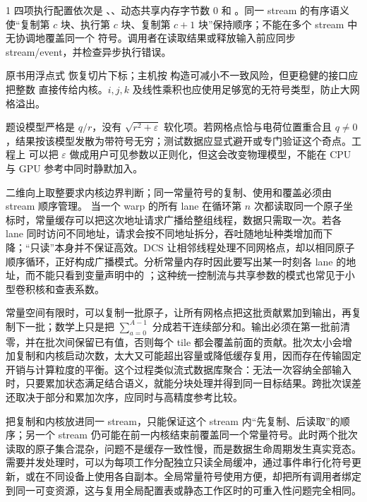 \begin{solutionexercise}{1}
四项执行配置依次是 、、动态共享内存字节数 0 和
。同一 stream 的有序语义使“复制第 $c$ 块、执行第 $c$ 块、复制第
$c+1$ 块”保持顺序；不能在多个 stream 中无协调地覆盖同一个 
符号。调用者在读取结果或释放输入前应同步 stream/event，并检查异步执行错误。

原书用浮点式  恢复切片下标；主机按
 构造可减小不一致风险，但更稳健的接口应把整数 
直接传给内核。$i,j,k$ 及线性乘积也应使用足够宽的无符号类型，防止大网格溢出。

题设模型严格是 $q/r$，没有 $\sqrt{r^2+\varepsilon}$ 软化项。若网格点恰与电荷位置重合且
$q\ne0$，结果按该模型发散为带符号无穷；测试数据应显式避开或专门验证这个奇点。工程上
可以把 $\varepsilon$ 做成用户可见参数以正则化，但这会改变物理模型，不能在 CPU 与 GPU
参考中同时静默加入。

\conclusionheading 二维向上取整要求内核边界判断；同一常量符号的复制、使用和覆盖必须由
stream 顺序管理。
\discussionheading
{}
当一个 warp 的所有 lane 在循环第 $n$ 次都读取同一个原子坐标时，常量缓存可以把这次地址请求广播给整组线程，数据只需取一次。若各 lane 同时访问不同地址，请求会按不同地址拆分，吞吐随地址种类增加而下降；“只读”本身并不保证高效。DCS 让相邻线程处理不同网格点，却以相同原子顺序循环，正好构成广播模式。分析常量内存时因此要写出某一时刻各 lane 的地址，而不能只看到变量声明中的 ；这种统一控制流与共享参数的模式也常见于小型卷积核和查表系数。

常量空间有限时，可以复制一批原子，让所有网格点把这批贡献累加到输出，再复制下一批；数学上只是把 $\sum_{a=0}^{A-1}$ 分成若干连续部分和。输出必须在第一批前清零，并在批次间保留已有值，否则每个 tile 都会覆盖前面的贡献。批次太小会增加复制和内核启动次数，太大又可能超出容量或降低缓存复用，因而存在传输固定开销与计算粒度的平衡。这个过程类似流式数据库聚合：无法一次容纳全部输入时，只要累加状态满足结合语义，就能分块处理并得到同一目标结果。跨批次误差还取决于部分和累加次序，应同时与高精度参考比较。

把复制和内核放进同一 stream，只能保证这个 stream 内“先复制、后读取”的顺序；另一个 stream 仍可能在前一内核结束前覆盖同一个常量符号。此时两个批次读取的原子集合混杂，问题不是缓存一致性慢，而是数据生命周期发生真实竞态。需要并发处理时，可以为每项工作分配独立只读全局缓冲，通过事件串行化符号更新，或在不同设备上使用各自副本。全局常量符号使用方便，却把所有调用者绑定到同一可变资源，这与复用全局配置表或静态工作区时的可重入性问题完全相同。


\end{solutionexercise}
